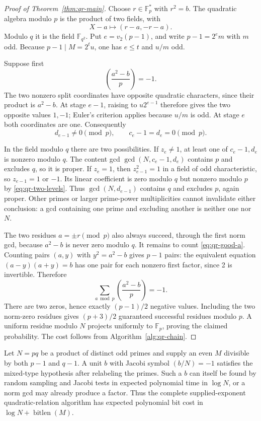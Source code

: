 \begin{proof}[Proof of Theorem~\ref{thm:qr-main}]
Choose $r\in\mathbb F_p^*$ with $r^2=b$.  The quadratic algebra
modulo $p$ is the product of two fields, with
\[
 X-a\longmapsto(r-a,-r-a).
\]
Modulo $q$ it is the field $\mathbb F_{q^2}$.
Put $e=v_2(p-1)$, and write $p-1=2^em$ with $m$ odd.
Because $p-1\mid M=2^tu$, one has $e\leq t$ and $u/m$ odd.

Suppose first
\begin{equation}
 \left(\frac{a^2-b}{p}\right)=-1.
 \label{eq:qr-good-a}
\end{equation}
The two nonzero split coordinates have opposite quadratic characters,
since their product is $a^2-b$.
At stage $e-1$, raising to $u2^{e-1}$ therefore gives the two opposite
values $1,-1$; Euler's criterion applies because $u/m$ is odd.
At stage $e$ both coordinates are one.  Consequently
\begin{equation}
 d_{e-1}\ne0\pmod p,
 \qquad c_e-1=d_e=0\pmod p.
 \label{eq:qr-two-levels}
\end{equation}

In the field modulo $q$ there are two possibilities.
If $z_e\ne1$, at least one of $c_e-1,d_e$ is nonzero modulo $q$.
The content gcd $\gcd(N,c_e-1,d_e)$ contains $p$ and excludes $q$,
so it is proper.  If $z_e=1$, then $z_{e-1}^2=1$ in a field of odd
characteristic, so $z_{e-1}=1$ or $-1$.  Its linear coefficient is zero
modulo $q$ but nonzero modulo $p$ by \eqref{eq:qr-two-levels}.
Thus $\gcd(N,d_{e-1})$ contains $q$ and excludes $p$, again proper.
Other primes or larger prime-power multiplicities cannot invalidate
either conclusion: a gcd containing one prime and excluding another
is neither one nor $N$.

The two residues $a=\pm r\pmod p$ also always succeed, through
the first norm gcd, because $a^2-b$ is never zero modulo $q$.
It remains to count \eqref{eq:qr-good-a}.  Counting pairs $(a,y)$ with
$y^2=a^2-b$ gives $p-1$ pairs: the equivalent equation
$(a-y)(a+y)=b$ has one pair for each nonzero first factor, since 2 is
invertible.  Therefore
\[
 \sum_{a\bmod p}\left(\frac{a^2-b}{p}\right)=-1.
\]
There are two zeros, hence exactly $(p-1)/2$ negative values.
Including the two norm-zero residues gives $(p+3)/2$ guaranteed
successful residues modulo $p$.  A uniform residue modulo $N$
projects uniformly to $\mathbb F_p$, proving the claimed probability.
The cost follows from Algorithm~\ref{alg:qr-chain}.
\end{proof}

\begin{corollary}
\label{cor:qr-semiprime}
Let $N=pq$ be a product of distinct odd primes and supply an even $M$
divisible by both $p-1$ and $q-1$.  A unit $b$ with Jacobi symbol
$(b/N)=-1$ satisfies the mixed-type hypothesis after relabeling the
primes.  Such a $b$ can itself be found by random sampling and Jacobi
tests in expected polynomial time in $\log N$, or a norm gcd may
already produce a factor.  Thus the complete supplied-exponent
quadratic-relation algorithm has expected polynomial bit cost in
$\log N+\operatorname{bitlen}(M)$.
\end{corollary}

